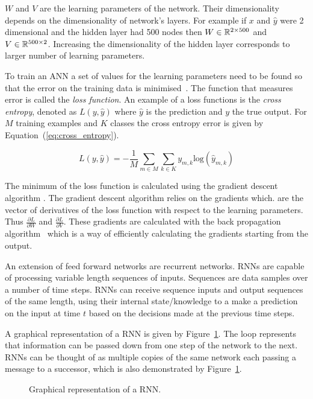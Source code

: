 \(W\) and \(V\) are the learning parameters of the network. Their dimensionality
depends on the dimensionality of network's layers. For example if \(x\) and \(\hat{y}\)
were 2 dimensional and the hidden layer had 500 nodes then \(W \in \mathbb{R}^{2 \times 500}\)
and \(V \in \mathbb{R}^{500 \times 2}\). Increasing the dimensionality of the hidden
layer corresponds to larger number of learning parameters.

To train an ANN a set of values for the learning parameters need to be found so
that the error on the training data is minimised~\cite{Gurney2007}. The function that measures
error is called the \textit{loss function}.
An example of a loss functions is the
\textit{cross entropy}, denoted as \(L(y, \hat{y})\) where \(\hat{y}\) is the
prediction and \(y\) the true output. For \(M\) training examples and \(K\)
classes the cross entropy error is given by Equation~(\ref{eq:cross_entropy}).

\begin{equation}\label{eq:cross_entropy}
    L(y, \hat{y}) = - \frac{1}{M} \sum_{m\in M} \sum_{k \in K} y_{m, k} \text{log}(\hat{y}_{m, k})
\end{equation}

The minimum of the loss function is calculated using the gradient descent algorithm
\cite{Ruder2016}. The gradient descent algorithm relies on the gradients which.
are the vector of derivatives of the loss function with respect to the learning
parameters. Thus \(\frac{\partial{L}}{\partial{W}}\) and
\(\frac{\partial{L}}{\partial{V}}\). These gradients are calculated with the
back propagation algorithm~\cite{Wythoff1993} which is a way of efficiently
calculating the gradients starting from the output.

An extension of feed forward networks are recurrent networks. RNNs are
capable of processing variable length sequences of inputs. Sequences are data
samples over a number of time steps. RNNs can receive sequence inputs and output
sequences of the same length, using their internal state/knowledge to a make a
prediction on the input at time \(t\) based on the decisions made at the
previous time steps.

A graphical representation of a RNN is given by
Figure~\ref{fig:rnn}. The loop represents that information can be passed
down from one step of the network to the next. RNNs can be thought of as
multiple copies of the same network each passing a message to a successor, which
is also demonstrated by Figure~\ref{fig:rnn}.

\begin{figure}[!htbp]
    \centering
    
    \caption{Graphical representation of a RNN.}\label{fig:rnn}
\end{figure}

